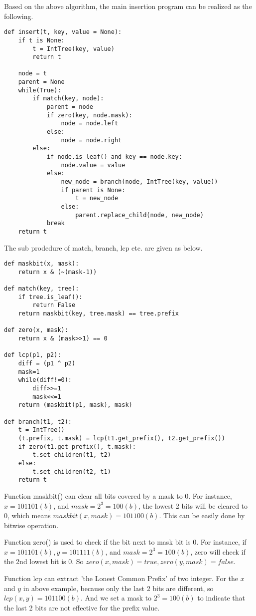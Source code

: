 \documentclass{article}
\begin{document}
Based on the above algorithm, the main insertion program can be realized 
as the following.

\begin{lstlisting}
def insert(t, key, value = None):
    if t is None:
        t = IntTree(key, value)
        return t

    node = t
    parent = None
    while(True):
        if match(key, node):
            parent = node
            if zero(key, node.mask):
                node = node.left
            else:
                node = node.right
        else:
            if node.is_leaf() and key == node.key:
                node.value = value
            else:
                new_node = branch(node, IntTree(key, value))
                if parent is None:
                    t = new_node
                else:
                    parent.replace_child(node, new_node)
            break
    return t
\end{lstlisting}

The sub prodedure of match, branch, lcp etc. are given as below.

\begin{lstlisting}
def maskbit(x, mask):
    return x & (~(mask-1))

def match(key, tree):
    if tree.is_leaf():
        return False
    return maskbit(key, tree.mask) == tree.prefix

def zero(x, mask):
    return x & (mask>>1) == 0

def lcp(p1, p2):
    diff = (p1 ^ p2)
    mask=1
    while(diff!=0):
        diff>>=1
        mask<<=1
    return (maskbit(p1, mask), mask)

def branch(t1, t2):
    t = IntTree()
    (t.prefix, t.mask) = lcp(t1.get_prefix(), t2.get_prefix())
    if zero(t1.get_prefix(), t.mask):
        t.set_children(t1, t2)
    else:
        t.set_children(t2, t1)
    return t
\end{lstlisting}

Function maskbit() can clear all bits covered by a mask to 0. For instance,
$x = 101101(b)$, and $mask = 2^3 = 100(b)$, the lowest 2 bits will be cleared to 0,
which means $maskbit(x, mask) = 101100(b)$. This can be easily done by bitwise
operation.

Function zero() is used to check if the bit next to mask bit is 0. For instance,
if $x = 101101(b), y = 101111(b)$, and $mask = 2^3 = 100(b)$, zero will check
if the 2nd lowest bit is 0. So $zero(x, mask) = true, zero(y, mask) = false$.

Function lcp can extract 'the Lonest Common Prefix' of two integer. For the $x$
and $y$ in above example, because only the last 2 bits are different, so
$lcp(x, y) = 101100(b)$. And we set a mask to $2^3 = 100(b)$ to indicate that
the last 2 bits are not effective for the prefix value.
\end{document}

